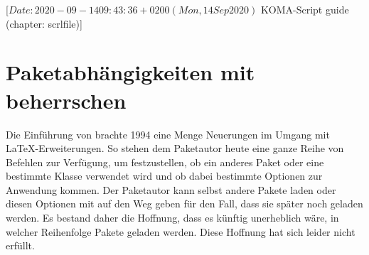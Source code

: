 %
%
%
%
%
%
%
%
% 
%
%
%
%

%
                 [$Date: 2020-09-14 09:43:36 +0200 (Mon, 14 Sep 2020) $
                  KOMA-Script guide (chapter: scrlfile)]

\chapter{Paketabhängigkeiten mit  
  beherrschen}

\BeginIndexGroup
{}

Die Einführung von \LaTeXe{} brachte 1994 eine Menge Neuerungen im Umgang mit
\LaTeX-Erweiterungen. So stehen dem Paketautor heute eine ganze Reihe von
Befehlen zur Verfügung, um festzustellen, ob ein anderes Paket oder eine
bestimmte Klasse verwendet wird und ob dabei bestimmte Optionen zur Anwendung
kommen. Der Paketautor kann selbst andere Pakete laden oder diesen Optionen
mit auf den Weg geben für den Fall, dass sie später noch geladen werden. Es
bestand daher die Hoffnung, dass es künftig unerheblich wäre, in welcher
Reihenfolge Pakete geladen werden. Diese Hoffnung hat sich leider nicht
erfüllt.

